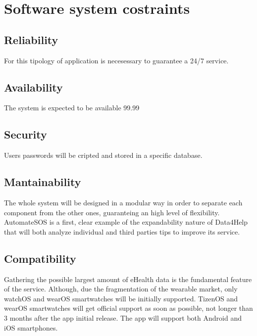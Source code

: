 \section{Software system costraints}
\subsection{Reliability}
For this tipology of application is necesessary to guarantee a 24/7 service.
\subsection{Availability}
The system is expected to be available 99.99%
\subsection{Security}
Users passwords will be cripted and stored in a specific database.
\subsection{Mantainability}
The whole system will be designed in a modular way in order to separate each component from the other ones, guaranteing an high level of flexibility. AutomateSOS is a first, clear example of the expandability nature of Data4Help that will both analyze individual and third parties tips to improve its service.
\subsection{Compatibility}
Gathering the possible largest amount of eHealth data is the fundamental feature of the service. Although, due the fragmentation of the wearable market, only watchOS and wearOS smartwatches will be initially supported. TizenOS and wearOS smartwatches will get official support as soon as possible, not longer than 3 months after the app initial release.
The app will support both Android and iOS smartphones. 